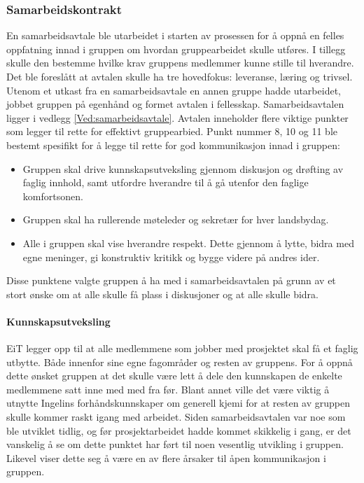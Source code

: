 \subsubsection{Samarbeidskontrakt}
En samarbeidsavtale ble utarbeidet i starten av prosessen for å oppnå en felles oppfatning innad i gruppen om hvordan gruppearbeidet skulle utføres.
I tillegg skulle den bestemme hvilke krav gruppens medlemmer kunne stille til hverandre.
Det ble foreslått at avtalen skulle ha tre hovedfokus: leveranse, læring og trivsel.
Utenom et utkast fra en samarbeidsavtale en annen gruppe hadde utarbeidet, jobbet gruppen på egenhånd og formet avtalen i fellesskap.
Samarbeidsavtalen ligger i vedlegg \ref{Ved:samarbeidsavtale}.
Avtalen inneholder flere viktige punkter som legger til rette for effektivt gruppearbied.
Punkt nummer 8, 10 og 11 ble bestemt spesifikt for å legge til rette for god kommunikasjon innad i gruppen:
\begin{itemize}
	\item Gruppen skal drive kunnskapsutveksling gjennom diskusjon og drøfting av faglig innhold, samt utfordre hverandre til å gå utenfor den faglige komfortsonen.
	\item Gruppen skal ha rullerende møteleder og sekretær for hver landsbydag.
	\item Alle i gruppen skal vise hverandre respekt. Dette gjennom å lytte, bidra med egne meninger, gi konstruktiv kritikk og bygge videre på andres ider.
\end{itemize}

Disse punktene valgte gruppen å ha med i samarbeidsavtalen på grunn av et stort ønske om at alle skulle få plass i diskusjoner og at alle skulle bidra.

\paragraph{Kunnskapsutveksling}
EiT legger opp til at alle medlemmene som jobber med prosjektet skal få et faglig utbytte.
Både innenfor sine egne fagområder og resten av gruppens.
For å oppnå dette ønsket gruppen at det skulle være lett å dele den kunnskapen de enkelte medlemmene satt inne med med fra før.
Blant annet ville det være viktig å utnytte Ingelins forhåndskunnskaper om generell kjemi for at resten av gruppen skulle kommer raskt igang med arbeidet.
Siden samarbeidsavtalen var noe som ble utviklet tidlig, og før prosjektarbeidet hadde kommet skikkelig i gang, er det vanskelig å se om dette punktet har ført til noen vesentlig utvikling i gruppen.
Likevel viser dette seg å være en av flere årsaker til åpen kommunikasjon i gruppen.

